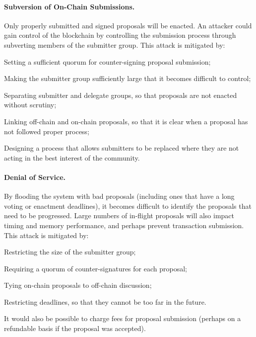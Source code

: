 \paragraph{Subversion of On-Chain Submissions.}
Only properly submitted and signed proposals will be enacted.  An attacker could gain control of the blockchain by controlling the submission process through
subverting members of the submitter group.
%
This attack is mitigated by:
  \begin{inparaenum}
  \item
    Setting a sufficient quorum for counter-signing proposal submission;
  \item
    Making the submitter group sufficiently large that it becomes difficult to control;
  \item
    Separating submitter and delegate groups, so that proposals are not enacted without scrutiny;
  \item
    Linking off-chain and on-chain proposals, so that it is clear when a proposal has not followed proper process;
  \item
    Designing a process that allows submitters to be replaced where they are not acting in the best interest of the community.
  \end{inparaenum}


\paragraph{Denial of Service.}
By flooding the system with bad proposals (including ones that have a long voting or enactment deadlines), it becomes difficult to identify the
proposals that need to be progressed.  Large numbers of in-flight proposals will also impact timing and memory performance, and perhaps prevent transaction submission.
%
This attack is mitigated by:
  \begin{inparaenum}
  \item
    Restricting the size of the submitter group;
  \item
    Requiring a quorum of counter-signatures for each proposal;
  \item
    Tying on-chain proposals to off-chain discussion;
  \item
    Restricting deadlines, so that they cannot be too far in the future.
  \end{inparaenum}
It would also be possible to charge fees for proposal submission (perhaps on a refundable basis if the proposal was accepted).

\pagebreak
